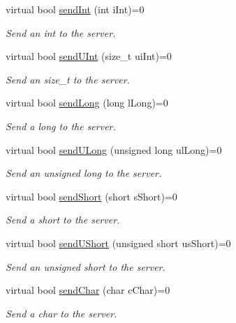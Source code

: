 \begin{DoxyCompactItemize}
virtual bool \mbox{\hyperlink{class_rad_j_a_v_1_1_networking_1_1_tcpip_client_a55e9334efa84818084a55b8121faaf2f}{send\+Int}} (int i\+Int)=0
\begin{DoxyCompactList}\small\item\em Send an int to the server. \end{DoxyCompactList}\item 
virtual bool \mbox{\hyperlink{class_rad_j_a_v_1_1_networking_1_1_tcpip_client_a2d318570f9e5e1c08c64c34a4b0e424b}{send\+U\+Int}} (size\+\_\+t ui\+Int)=0
\begin{DoxyCompactList}\small\item\em Send an size\+\_\+t to the server. \end{DoxyCompactList}\item 
virtual bool \mbox{\hyperlink{class_rad_j_a_v_1_1_networking_1_1_tcpip_client_aceb6808d0f664dca25ebd56ca1d487ed}{send\+Long}} (long l\+Long)=0
\begin{DoxyCompactList}\small\item\em Send a long to the server. \end{DoxyCompactList}\item 
virtual bool \mbox{\hyperlink{class_rad_j_a_v_1_1_networking_1_1_tcpip_client_a0d74f790e410fbecba34e53d4d47ad9f}{send\+U\+Long}} (unsigned long ul\+Long)=0
\begin{DoxyCompactList}\small\item\em Send an unsigned long to the server. \end{DoxyCompactList}\item 
virtual bool \mbox{\hyperlink{class_rad_j_a_v_1_1_networking_1_1_tcpip_client_ab9d07bcc1dc53c68a1f65bce0fdf613b}{send\+Short}} (short s\+Short)=0
\begin{DoxyCompactList}\small\item\em Send a short to the server. \end{DoxyCompactList}\item 
virtual bool \mbox{\hyperlink{class_rad_j_a_v_1_1_networking_1_1_tcpip_client_a47f22ef4c7e7a8b5a938b8f567eee0ee}{send\+U\+Short}} (unsigned short us\+Short)=0
\begin{DoxyCompactList}\small\item\em Send an unsigned short to the server. \end{DoxyCompactList}\item 
virtual bool \mbox{\hyperlink{class_rad_j_a_v_1_1_networking_1_1_tcpip_client_a03068a5be5c7a1482aacf0c706ad3d9d}{send\+Char}} (char c\+Char)=0
\begin{DoxyCompactList}\small\item\em Send a char to the server. \end{DoxyCompactList}\item 

\end{DoxyCompactItemize}
